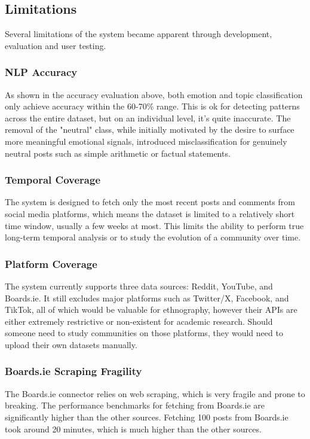 \documentclass[12pt, a4paper]{article}
\begin{document}
\subsection{Limitations}
Several limitations of the system became apparent through development, evaluation and user testing.

\subsubsection{NLP Accuracy}
As shown in the accuracy evaluation above, both emotion and topic classification only achieve accuracy within the 60-70\% range. This is ok for detecting patterns across the entire dataset, but on an individual level, it's quite inaccurate. The removal of the "neutral" class, while initially motivated by the desire to surface more meaningful emotional signals, introduced misclassification for genuinely neutral posts such as simple arithmetic or factual statements.

\subsubsection{Temporal Coverage}
The system is designed to fetch only the most recent posts and comments from social media platforms, which means the dataset is limited to a relatively short time window, usually a few weeks at most. This limits the ability to perform true long-term temporal analysis or to study the evolution of a community over time.

\subsubsection{Platform Coverage}
The system currently supports three data sources: Reddit, YouTube, and Boards.ie. It still excludes major platforms such as Twitter/X, Facebook, and TikTok, all of which would be valuable for ethnography, however their APIs are either extremely restrictive or non-existent for academic research. Should someone need to study communities on those platforms, they would need to upload their own datasets manually.

\subsubsection{Boards.ie Scraping Fragility}
The Boards.ie connector relies on web scraping, which is very fragile and prone to breaking. The performance benchmarks for fetching from Boards.ie are significantly higher than the other sources. Fetching 100 posts from Boards.ie took around 20 minutes, which is much higher than the other sources.
\end{document}
